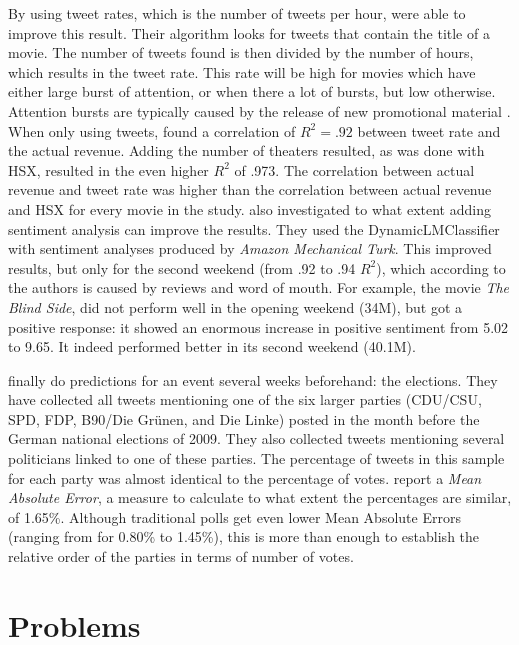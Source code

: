 \documentclass[12pt]{article}
\begin{document}
By using tweet rates, which is the number of tweets per hour,  were able to improve this result. Their algorithm looks for tweets that contain the title of a movie. The number of tweets found is then divided by the number of hours, which results in the tweet rate. This rate will be high for movies which have either large burst of attention, or when there a lot of bursts, but low otherwise. Attention bursts are typically caused by the release of new promotional material \cite{asur+10}. When only using tweets,  found a correlation of $R^2 = .92$ between tweet rate and the actual revenue. Adding the number of theaters resulted, as was done with HSX, resulted in the even higher $R^2$ of .973. The correlation between actual revenue and tweet rate was higher than the correlation between actual revenue and HSX for every movie in the study.  also investigated to what extent adding sentiment analysis can improve the results. They used the DynamicLMClassifier with sentiment analyses produced by \emph{Amazon Mechanical Turk}. This improved results, but only for the second weekend (from .92 to .94 $R^2$), which according to the authors is caused by reviews and word of mouth. For example, the movie \emph{The Blind Side}, did not perform well in the opening weekend (34M), but got a positive response: it showed an enormous increase in positive sentiment from 5.02 to 9.65. It indeed performed better in its second weekend (40.1M). 

 finally do predictions for an event several weeks beforehand: the elections. They have collected all tweets mentioning one of the six larger parties (CDU/CSU, SPD, FDP, B90/Die Grünen, and Die Linke) posted in the month before the German national elections of 2009. They also collected tweets mentioning several politicians linked to one of these parties. The percentage of tweets in this sample for each party was almost identical to the percentage of votes.  report a \emph{Mean Absolute Error}, a measure to calculate to what extent the percentages are similar, of 1.65\%. Although traditional polls get even lower Mean Absolute Errors (ranging from for 0.80\% to 1.45\%), this is more than enough to establish the relative order of the parties in terms of number of votes. 

\section{Problems} \label{problems}
\end{document}
